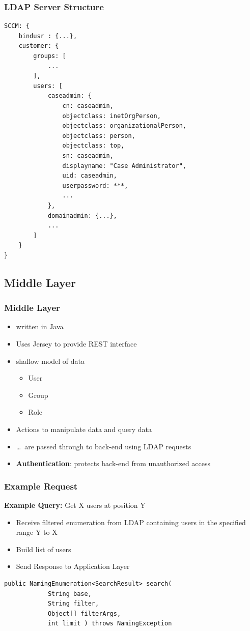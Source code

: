 \documentclass{beamer}
\begin{document}
\begin{frame}[fragile]
	\frametitle{LDAP Server Structure}
	\lstset{%
		basicstyle=\tiny
	}
	\begin{lstlisting}
SCCM: {
	bindusr : {...},
	customer: {
		groups: [
			...
		],
		users: [
			caseadmin: {
				cn: caseadmin,
				objectclass: inetOrgPerson,
				objectclass: organizationalPerson,
				objectclass: person,
				objectclass: top,
				sn: caseadmin,
				displayname: "Case Administrator",
				uid: caseadmin,
				userpassword: ***,
				...
			},
			domainadmin: {...},
			...
		]
	}
}
	\end{lstlisting}
\end{frame}

\subsection{Middle Layer}

\begin{frame}
	\frametitle{Middle Layer}
	\begin{itemize}
		\item written in Java
		\item Uses Jersey to provide REST interface
		\item shallow model of data
			\begin{itemize}
				\item User
				\item Group
				\item Role
			\end{itemize}
		\item Actions to manipulate data and query data
		\item \dots\ are passed through to back-end using LDAP requests
		\item \textbf{Authentication}: protects back-end from
			unauthorized access
	\end{itemize}
\end{frame}

\begin{frame}[fragile]
	\frametitle{Example Request}
	\textbf{Example Query:} Get X users at position Y
	\begin{itemize}
	 \item Receive filtered enumeration from LDAP containing users in the specified range Y to X
	 \item Build list of users
	 \item Send Response to Application Layer
	\end{itemize}
\begin{lstlisting}[frame=single]
public NamingEnumeration<SearchResult> search(
            String base,
            String filter,
            Object[] filterArgs,
            int limit ) throws NamingException
\end{lstlisting}
\end{frame}
\end{document}
